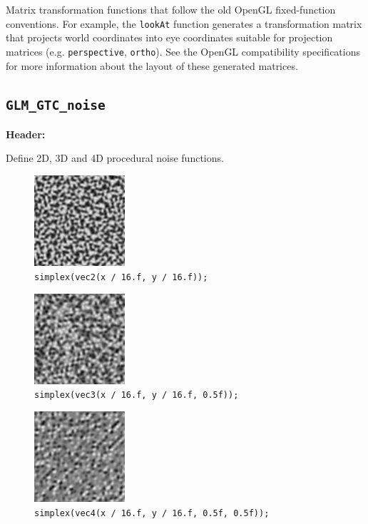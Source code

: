 \documentclass{scrartcl}
\numberwithin{figure}{subsection}
\begin{document}
Matrix transformation functions that follow the old OpenGL fixed-function conventions. For example, the \verb|lookAt| function generates a transformation matrix that projects world coordinates into eye coordinates suitable for projection matrices (e.g. \verb|perspective|, \verb|ortho|). See the OpenGL compatibility specifications for more information about the layout of these generated matrices.

\subsection{\texttt{GLM\_GTC\_noise}}
\textbf{Header:} 

Define 2D, 3D and 4D procedural noise functions.

\begin{figure}
  \centering
  \includegraphics[width=0.3\textwidth]{simplex1}
  \cprotect\caption{\verb|simplex(vec2(x / 16.f, y / 16.f));|}
\end{figure}

\begin{figure}
  \centering
  \includegraphics[width=0.3\textwidth]{simplex2}
  \cprotect\caption{\verb|simplex(vec3(x / 16.f, y / 16.f, 0.5f));|}
\end{figure}

\begin{figure}
  \centering
  \includegraphics[width=0.3\textwidth]{simplex3}
  \cprotect\caption{\verb|simplex(vec4(x / 16.f, y / 16.f, 0.5f, 0.5f));|}
\end{figure}
\end{document}
